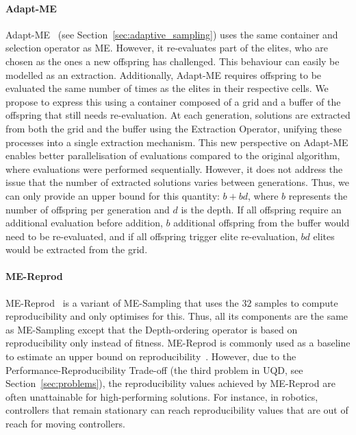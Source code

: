 \paragraph{Adapt-ME}
Adapt-ME~\cite{adaptive} (see Section~\ref{sec:adaptive_sampling}) uses the same container and selection operator as ME. However, it re-evaluates part of the elites, who are chosen as the ones a new offspring has challenged. This behaviour can easily be modelled as an extraction. Additionally, Adapt-ME requires offspring to be evaluated the same number of times as the elites in their respective cells. 
We propose to express this using a container composed of a grid and a buffer of the offspring that still needs re-evaluation. At each generation, solutions are extracted from both the grid and the buffer using the Extraction Operator, unifying these processes into a single extraction mechanism.
This new perspective on Adapt-ME enables better parallelisation of evaluations compared to the original algorithm, where evaluations were performed sequentially. However, it does not address the issue that the number of extracted solutions varies between generations. Thus, we can only provide an upper bound for this quantity: $b + bd$, where $b$ represents the number of offspring per generation and $d$ is the depth. If all offspring require an additional evaluation before addition, $b$ additional offspring from the buffer would need to be re-evaluated, and if all offspring trigger elite re-evaluation, $bd$ elites would be extracted from the grid.


\paragraph{ME-Reprod}
ME-Reprod~\cite{grillotti2023don} is a variant of ME-Sampling that uses the $32$ samples to compute reproducibility and only optimises for this. Thus, all its components are the same as ME-Sampling except that the Depth-ordering operator is based on reproducibility only instead of fitness. ME-Reprod is commonly used as a baseline to estimate an upper bound on reproducibility~\cite{grillotti2023don, flageat2024exploring}. However, due to the Performance-Reproducibility Trade-off (the third problem in UQD, see Section~\ref{sec:problems}), the reproducibility values achieved by ME-Reprod are often unattainable for high-performing solutions. For instance, in robotics, controllers that remain stationary can reach reproducibility values that are out of reach for moving controllers.

